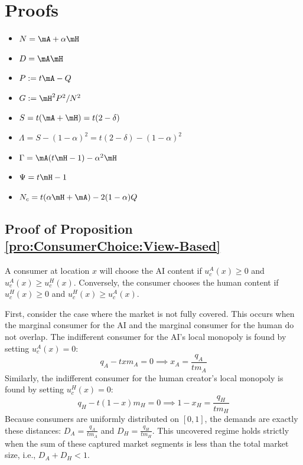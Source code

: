 
\appendix
\section{Proofs}\label{app:proofs}
\begin{itemize}
    \item $N=\mA+\alpha\mH$ 
    \item $D=\mA\mH$
    \item $P := t\mA - Q$ 
    \item $G := \mH^2 P^2/N^2$
    \item $S = t(\mA + \mH) = t(2-\delta)$
    \item $\Lambda=S - (1-\alpha)^2=t(2-\delta)-(1-\alpha)^{2}$
    \item $\Gamma=\mA(t\mH-1)-\alpha^{2}\mH$
    \item $\Psi=t\mH-1$
    \item $N_c = t(\alpha\mH + \mA) - 2(1-\alpha)Q$ 
\end{itemize}

\subsection*{Proof of Proposition \ref{pro:ConsumerChoice:View-Based}}

A consumer at location $x$ will choose the AI content if $u_c^A(x) \ge 0$ and $u_c^A(x) \ge u_c^H(x)$. Conversely, the consumer chooses the human content if $u_c^H(x) \ge 0$ and $u_c^H(x) \ge u_c^A(x)$.

First, consider the case where the market is not fully covered. This occurs when the marginal consumer for the AI and the marginal consumer for the human do not overlap. The indifferent consumer for the AI's local monopoly is found by setting $u_c^A(x) = 0$:
\begin{equation*}
    q_A - t x m_A = 0 \implies x_A = \frac{q_A}{t m_A}
\end{equation*}
Similarly, the indifferent consumer for the human creator's local monopoly is found by setting $u_c^H(x) = 0$:
\begin{equation*}
    q_H - t(1-x)m_H = 0 \implies 1-x_H = \frac{q_H}{t m_H}
\end{equation*}
Because consumers are uniformly distributed on $[0,1]$, the demands are exactly these distances: $D_A = \frac{q_A}{t m_A}$ and $D_H = \frac{q_H}{t m_H}$. This uncovered regime holds strictly when the sum of these captured market segments is less than the total market size, i.e., $D_A + D_H < 1$.

